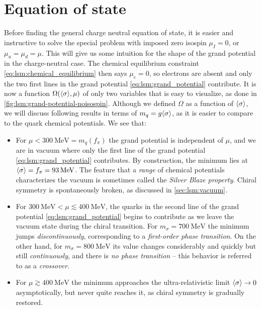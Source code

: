 \section{Equation of state}

Before finding the general charge neutral equation of state,
it is easier and instructive to solve the special problem with imposed zero isospin $\mu_I=0$, or $\mu_u=\mu_d=\mu$.
This will give us some intuition for the shape of the grand potential in the charge-neutral case.
The chemical equilibrium constraint \eqref{eq:lsm:chemical_equilibrium} then says $\mu_e=0$,
so electrons are absent and only the two first lines in the grand potential \eqref{eq:lsm:grand_potential} contribute.
It is now a function $\Omega(\langle \sigma \rangle,\mu)$ of only two variables that is easy to visualize, as done in \cref{fig:lsm:grand-potential-noisospin}.
Although we defined $\Omega$ as a function of $\langle \sigma \rangle$, we will discuss following results in terms of $m_q = g \langle \sigma \rangle$, as it is easier to compare to the quark chemical potentials.
We see that:
\begin{itemize}
\item For $\mu < \SI{300}{\mega\electronvolt} = m_q(f_\pi)$ the grand potential is independent of $\mu$,
      and we are in vacuum where only the first line of the grand potential \eqref{eq:lsm:grand_potential} contributes.
      By construction, the minimum lies at $\langle \sigma \rangle = f_\pi = \SI{93}{\mega\electronvolt}$.
      The feature that a \emph{range} of chemical potentials characterizes the vacuum is sometimes called the \emph{Silver Blaze property}.
      Chiral symmetry is spontaneously broken, as discussed in \cref{sec:lsm:vacuum}.
\item For $\SI{300}{\mega\electronvolt} < \mu \lesssim \SI{400}{\mega\electronvolt}$,
      the quarks in the second line of the grand potential \eqref{eq:lsm:grand_potential} begins to contribute as we leave the vacuum state during the chiral transition.
      For $m_\sigma = \SI{700}{\mega\electronvolt}$ the minimum jumps \emph{discontinuously}, corresponding to a \emph{first-order phase transition}.
      On the other hand, for $m_\sigma = \SI{800}{\mega\electronvolt}$ its value changes considerably and quickly but still \emph{continuously},
      and there is \emph{no phase transition} -- this behavior is referred to as a \emph{crossover}.
\item For $\mu \gtrsim \SI{400}{\mega\electronvolt}$ the minimum approaches the ultra-relativistic limit $\langle \sigma \rangle \rightarrow 0$ asymptotically,
      but never quite reaches it,
      as chiral symmetry is gradually restored.
\end{itemize}

